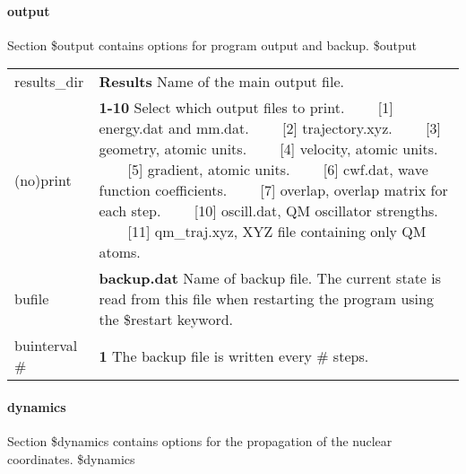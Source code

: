 \documentclass{report}
\newcommand{\tabitem}{~~\llap{--}~~}
\begin{document}
\paragraph{output}
Section \$output contains options for program output and backup. \newline
\$output

\begin{tabularx}{\textwidth}{ m{2.5cm} X }
results\_dir &
	\textbf{Results} \newline
	Name of the main output file. \\

(no)print		&
	\textbf{1-10} \newline
	Select which output files to print. \newline
	\tabitem [1]   energy.dat and mm.dat. \newline
	\tabitem [2]   trajectory.xyz. \newline
	\tabitem [3]   geometry, atomic units. \newline
	\tabitem [4]   velocity, atomic units. \newline
	\tabitem [5]   gradient, atomic units. \newline
	\tabitem [6]   cwf.dat, wave function coefficients. \newline
	\tabitem [7]   overlap, overlap matrix for each step. \newline
	\tabitem [10]  oscill.dat, QM oscillator strengths. \newline
	\tabitem [11]  qm\_traj.xyz, XYZ file containing only QM atoms. \\

bufile			& 
	\textbf{backup.dat} \newline
	Name of backup file. The current state is read from this file when restarting the program using the \$restart keyword. \\
	
buinterval \#	&
	\textbf{1} \newline
	The backup file is written every \# steps. \\
\end{tabularx}


\paragraph{dynamics}
Section \$dynamics contains options for the propagation of the nuclear coordinates. \newline
\$dynamics
\end{document}
